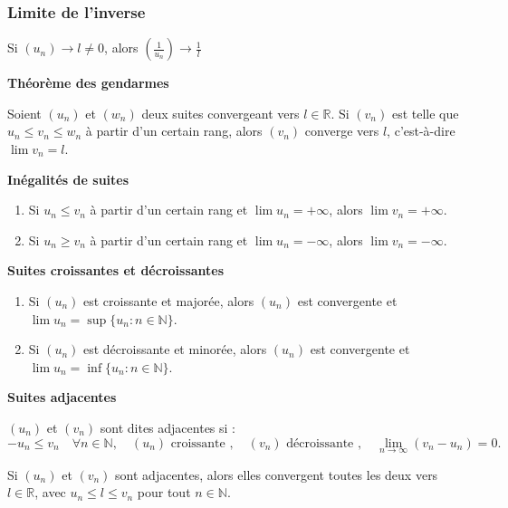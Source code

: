 \documentclass[a4paper,10pt]{article}
\begin{document}
\subsubsection*{Limite de l'inverse}

Si \( (u_n) \to l \neq 0 \), alors \( \left(\frac{1}{u_n}\right) \to \frac{1}{l} \)

\vspace{0.5cm}

\textbf{Théorème des gendarmes}

Soient \( (u_n) \) et \( (w_n) \) deux suites convergeant vers \( l \in \mathbb{R} \). Si \( (v_n) \) est telle que \( u_n \leq v_n \leq w_n \) à partir d'un certain rang, alors \( (v_n) \) converge vers \( l \), c'est-à-dire \( \lim v_n = l \).

\vspace{0.5cm}

\textbf{Inégalités de suites}

\begin{enumerate}
	\item Si \( u_n \leq v_n \) à partir d'un certain rang et \( \lim u_n = +\infty \), alors \( \lim v_n = +\infty \).
	\item Si \( u_n \geq v_n \) à partir d'un certain rang et \( \lim u_n = -\infty \), alors \( \lim v_n = -\infty \).
\end{enumerate}

\vspace{0.5cm}

\textbf{Suites croissantes et décroissantes}

\begin{enumerate}
	\item Si \( (u_n) \) est croissante et majorée, alors \( (u_n) \) est convergente et \( \lim u_n = \sup \{ u_n : n \in \mathbb{N} \} \).
	\item Si \( (u_n) \) est décroissante et minorée, alors \( (u_n) \) est convergente et \( \lim u_n = \inf \{ u_n : n \in \mathbb{N} \} \).
\end{enumerate}

\vspace{0.5cm}

\textbf{Suites adjacentes}

\( (u_n) \) et \( (v_n) \) sont dites adjacentes si :
\[
- u_n \leq v_n \quad \forall n \in \mathbb{N}, \quad (u_n) \text{ croissante }, \quad (v_n) \text{ décroissante }, \quad \lim_{n \to \infty} (v_n - u_n) = 0.
\]

Si \( (u_n) \) et \( (v_n) \) sont adjacentes, alors elles convergent toutes les deux vers \( l \in \mathbb{R} \), avec \( u_n \leq l \leq v_n \) pour tout \( n \in \mathbb{N} \).
\end{document}
